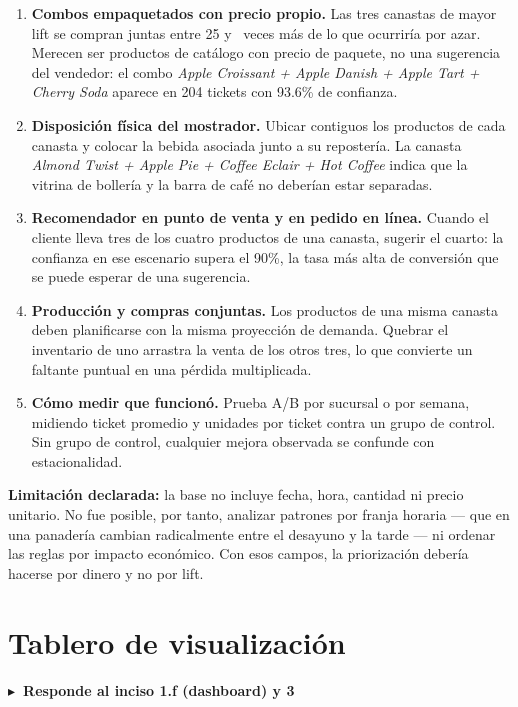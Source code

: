 \documentclass[11pt,a4paper]{article}
\newcommand{\inciso}[1]{%
  \vspace{0.2em}\noindent\textcolor{gacento}{\sffamily\bfseries\small
  $\blacktriangleright$~Responde al inciso #1}\vspace{0.3em}\par}
\begin{document}
\begin{enumerate}[leftmargin=*]
\item \textbf{Combos empaquetados con precio propio.} Las tres canastas de mayor
      lift se compran juntas entre 25 y \LiftMax~veces más de lo que ocurriría
      por azar. Merecen ser productos de catálogo con precio de paquete, no una
      sugerencia del vendedor: el combo \emph{Apple Croissant + Apple Danish +
      Apple Tart + Cherry Soda} aparece en 204 tickets con 93.6\% de confianza.
\item \textbf{Disposición física del mostrador.} Ubicar contiguos los productos
      de cada canasta y colocar la bebida asociada junto a su repostería. La
      canasta \emph{Almond Twist + Apple Pie + Coffee Eclair + Hot Coffee} indica
      que la vitrina de bollería y la barra de café no deberían estar separadas.
\item \textbf{Recomendador en punto de venta y en pedido en línea.} Cuando el
      cliente lleva tres de los cuatro productos de una canasta, sugerir el
      cuarto: la confianza en ese escenario supera el 90\%, la tasa más alta de
      conversión que se puede esperar de una sugerencia.
\item \textbf{Producción y compras conjuntas.} Los productos de una misma canasta
      deben planificarse con la misma proyección de demanda. Quebrar el inventario
      de uno arrastra la venta de los otros tres, lo que convierte un faltante
      puntual en una pérdida multiplicada.
\item \textbf{Cómo medir que funcionó.} Prueba A/B por sucursal o por semana,
      midiendo ticket promedio y unidades por ticket contra un grupo de control.
      Sin grupo de control, cualquier mejora observada se confunde con
      estacionalidad.
\end{enumerate}

\begin{nota}
\small \textbf{Limitación declarada:} la base no incluye fecha, hora, cantidad ni
precio unitario. No fue posible, por tanto, analizar patrones por franja horaria
--- que en una panadería cambian radicalmente entre el desayuno y la tarde --- ni
ordenar las reglas por impacto económico. Con esos campos, la priorización debería
hacerse por dinero y no por lift.
\end{nota}

\section{Tablero de visualización}
\label{sec:tablero}
\inciso{1.f (dashboard) y 3}
\end{document}
